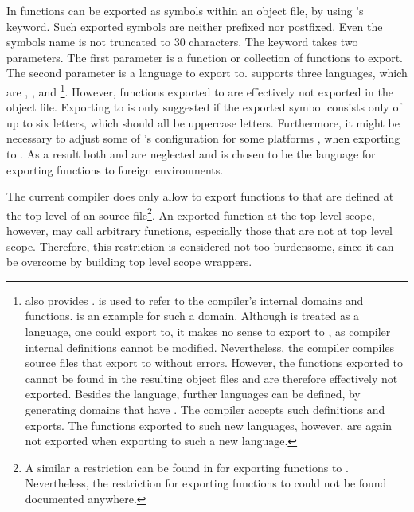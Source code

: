 In \Aldor functions can be exported as symbols within an object file, by using \Aldor's  keyword. Such exported symbols are neither prefixed nor postfixed. Even the symbols name is not truncated to $30$ characters. The  keyword takes two parameters. The first parameter is a function or collection of functions to export. The second parameter is a language to export to. \Aldor supports three languages, which are \Lisp, \Fortran, and \C\footnote{\Aldor also provides .  is used to refer to the compiler's internal domains and functions.  is an example for such a domain. Although  is treated as a language, one could export to, it makes no sense to export to , as compiler internal definitions cannot be modified. Nevertheless, the compiler compiles source files that export to  without errors. However, the functions exported to  cannot be found in the resulting object files and are therefore effectively not exported. Besides the  language, further languages can be defined, by generating domains that have . The compiler accepts such definitions and exports. The functions exported to such new languages, however, are again not exported when exporting to such a new language.}. However, functions exported to \Lisp are effectively not exported in the object file. Exporting to \Fortran is only suggested \cite[section 20.4]{AldorUG} if the exported symbol consists only of up to six letters, which should all be uppercase letters. Furthermore, it might be necessary to adjust some of \Aldor's configuration for some platforms \cite[section 20.5]{AldorUG}, when exporting to \Fortran. As a result both \Lisp and \Fortran are neglected and \C is chosen to be the language for exporting functions to foreign environments.

The current \Aldor compiler does only allow to export functions to \C that are defined at the top level of an \Aldor source file\footnote{A similar a restriction can be found in \cite{AldorUG} for exporting functions to \Fortran. Nevertheless, the restriction for exporting functions to \C could not be found documented anywhere.}. An exported function at the top level scope, however, may call arbitrary functions, especially those that are not at top level scope. Therefore, this restriction is considered not too burdensome, since it can be overcome by building top level scope wrappers.

